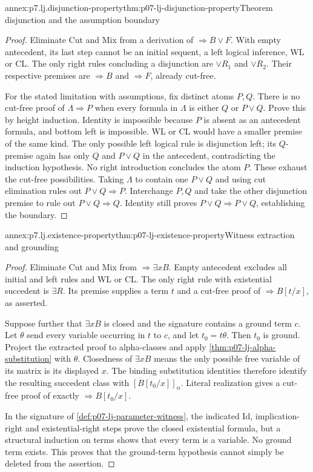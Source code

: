 \begin{annexitem}{annex:p7.lj.disjunction-property}{thm:p07-lj-disjunction-property}{Theorem disjunction and the assumption boundary}
\begin{proof}
Eliminate Cut and Mix from a derivation of
\(\Rightarrow B\lor F\).  With empty antecedent, its last step
cannot be an initial sequent, a left logical inference, WL or CL.
The only right rules concluding a disjunction are \(\lor R_1\)
and \(\lor R_2\).  Their respective premises are
\(\Rightarrow B\) and \(\Rightarrow F\), already cut-free.

For the stated limitation with assumptions, fix distinct atoms \(P,Q\).
There is no cut-free proof of \(\Lambda\Rightarrow P\) when every
formula in \(\Lambda\) is either \(Q\) or \(P\lor Q\).
Prove this by height induction.  Identity is impossible because
\(P\) is absent as an antecedent formula, and bottom left is
impossible.  WL or CL would have a smaller premise of the same kind.
The only possible left logical rule is disjunction left; its
\(Q\)-premise again has only \(Q\) and \(P\lor Q\) in the
antecedent, contradicting the induction hypothesis.  No right
introduction concludes the atom \(P\).  These exhaust the cut-free
possibilities.  Taking \(\Lambda\) to contain one \(P\lor Q\)
and using cut elimination rules out \(P\lor Q\Rightarrow P\).
Interchange \(P,Q\) and take the other disjunction premise to rule
out \(P\lor Q\Rightarrow Q\).  Identity still proves
\(P\lor Q\Rightarrow P\lor Q\), establishing the boundary.
\end{proof}
\end{annexitem}

\begin{annexitem}{annex:p7.lj.existence-property}{thm:p07-lj-existence-property}{Witness extraction and grounding}
\begin{proof}
Eliminate Cut and Mix from \(\Rightarrow\exists xB\).  Empty
antecedent excludes all initial and left rules and WL or CL.  The
only right rule with existential succedent is \(\exists R\).
Its premise supplies a term \(t\) and a cut-free proof of
\(\Rightarrow B[t/x]\), as asserted.

Suppose further that \(\exists xB\) is closed and the signature
contains a ground term \(c\).  Let \(\theta\) send every variable
occurring in \(t\) to \(c\), and let \(t_0=t\theta\).
Then \(t_0\) is ground.  Project the extracted proof to alpha-classes
and apply \ref{thm:p07-lj-alpha-substitution} with \(\theta\).
Closedness of \(\exists xB\) means the only possible free variable
of its matrix is its displayed \(x\).  The binding substitution
identities therefore identify the resulting succedent class with
\([B[t_0/x]]_\alpha\).  Literal realization gives a cut-free proof
of exactly \(\Rightarrow B[t_0/x]\).

In the signature of \ref{def:p07-lj-parameter-witness}, the indicated
Id, implication-right and existential-right steps prove the closed
existential formula, but a structural induction on terms shows that
every term is a variable.  No ground term exists.  This proves that
the ground-term hypothesis cannot simply be deleted from the assertion.
\end{proof}
\end{annexitem}

